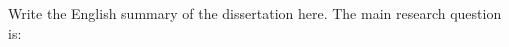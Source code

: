 
Write the English summary of the dissertation here. The main research question is:

\mainrq

\lipsum[1-2]
